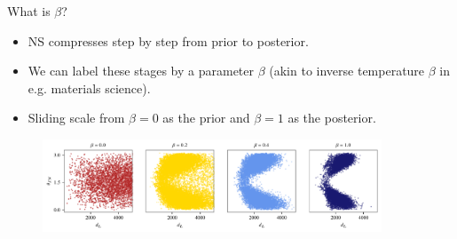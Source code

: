 \documentclass[aspectratio=169, 11pt]{beamer}
\begin{document}
\begin{frame}{What is $\beta$?}
\begin{itemize}\vspace{2em}
    \item NS compresses step by step from prior to posterior.
    \item We can label these stages by a parameter $\beta$ (akin to inverse temperature $\beta$ in e.g. materials science). 
    \item Sliding scale from $\beta = 0$ as the prior and $\beta = 1$ as the posterior. 
\end{itemize}
\begin{figure}
    \centering
    \includegraphics[width=0.9\textwidth]{Ca_Foscari Beamer/presentation_beta_extrinsic.pdf}
\end{figure}

\end{frame}




\end{document}
